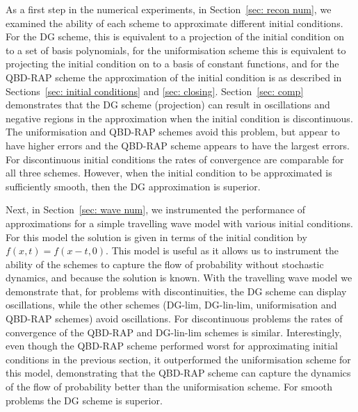 As a first step in the numerical experiments, in Section~\ref{sec: recon num}, we examined the ability of each scheme to approximate different initial conditions. For the DG scheme, this is equivalent to a projection of the initial condition on to a set of basis polynomials, for the uniformisation scheme this is equivalent to projecting the initial condition on to a basis of constant functions, and for the QBD-RAP scheme the approximation of the initial condition is as described in Sections~\ref{sec: initial conditions} and \ref{sec: closing}. Section~\ref{sec: comp} demonstrates that the DG scheme (projection) can result in oscillations and negative regions in the approximation when the initial condition is discontinuous. The uniformisation and QBD-RAP schemes avoid this problem, but appear to have higher errors and the QBD-RAP scheme appears to have the largest errors. For discontinuous initial conditions the rates of convergence are comparable for all three schemes. However, when the initial condition to be approximated is sufficiently smooth, then the DG approximation is superior. 

Next, in Section~\ref{sec: wave num}, we instrumented the performance of approximations for a simple travelling wave model with various initial conditions. For this model the solution is given in terms of the initial condition by \(f(x,t) = f(x-t,0)\). This model is useful as it allows us to instrument the ability of the schemes to capture the flow of probability without stochastic dynamics, and because the solution is known. With the travelling wave model we demonstrate that, for problems with discontinuities, the DG scheme can display oscillations, while the other schemes (DG-lim, DG-lin-lim, uniformisation and QBD-RAP schemes) avoid oscillations. For discontinuous problems the rates of convergence of the QBD-RAP and DG-lin-lim schemes is similar. Interestingly, even though the QBD-RAP scheme performed worst for approximating initial conditions in the previous section, it outperformed the uniformisation scheme for this model, demonstrating that the QBD-RAP scheme can capture the dynamics of the flow of probability better than the uniformisation scheme. For smooth problems the DG scheme is superior.

